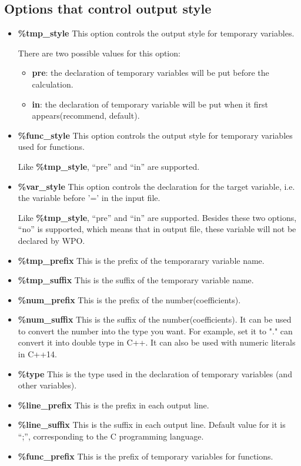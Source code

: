 \documentclass[a4paper]{article}
\begin{document}
\subsection{Options that control output style}
\begin{itemize}
\item \textbf{\%tmp\_style}
This option controls the output style for temporary variables.

There are two possible values for this option:
\begin{itemize}
\item \textbf{pre}: the declaration of temporary variables will be put before the calculation.
\item \textbf{in}: the declaration of temporary variable will be put when it first appears(recommend, default).
\end{itemize}


\item \textbf{\%func\_style}
This option controls the output style for temporary variables used for functions.

Like \textbf{\%tmp\_style}, ``pre'' and ``in'' are supported.

\item \textbf{\%var\_style}
This option controls the declaration for the target variable, i.e. the variable before '=' in the input file.

Like \textbf{\%tmp\_style}, ``pre'' and ``in'' are supported. Besides these two options, ``no'' is supported, which means that in output file, these variable will not be declared by WPO.

\item \textbf{\%tmp\_prefix}
This is the prefix of the temporarary variable name.
\item \textbf{\%tmp\_suffix}
This is the suffix of the temporary variable name.

\item \textbf{\%num\_prefix}
    This is the prefix of the number(coefficients).
\item \textbf{\%num\_suffix}
    This is the suffix of the number(coefficients). It can be used to convert the number into the type you want. For example, set it to "." can convert it into double type in C++. It can also be used with numeric literals in C++14.

\item \textbf{\%type}
This is the type used in the declaration of temporary variables (and other variables).

\item \textbf{\%line\_prefix}
This is the prefix in each output line.

\item \textbf{\%line\_suffix}
This is the suffix in each output line. Default value for it is ``;'', corresponding to the C programming language.

\item \textbf{\%func\_prefix}
This is the prefix of temporary variables for functions.

\end{itemize}
\end{document}
